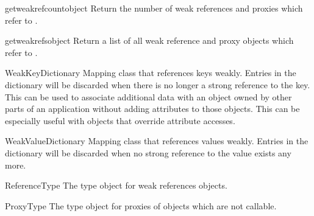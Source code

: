 \begin{funcdesc}{getweakrefcount}{object}
  Return the number of weak references and proxies which refer to
  .
\end{funcdesc}

\begin{funcdesc}{getweakrefs}{object}
  Return a list of all weak reference and proxy objects which refer to
  .
\end{funcdesc}

\begin{classdesc}{WeakKeyDictionary}{}
  Mapping class that references keys weakly.  Entries in the
  dictionary will be discarded when there is no longer a strong
  reference to the key.  This can be used to associate additional data
  with an object owned by other parts of an application without adding
  attributes to those objects.  This can be especially useful with
  objects that override attribute accesses.

\end{classdesc}

\begin{classdesc}{WeakValueDictionary}{}
  Mapping class that references values weakly.  Entries in the
  dictionary will be discarded when no strong reference to the value
  exists any more.

\end{classdesc}

\begin{datadesc}{ReferenceType}
  The type object for weak references objects.
\end{datadesc}

\begin{datadesc}{ProxyType}
  The type object for proxies of objects which are not callable.
\end{datadesc}

